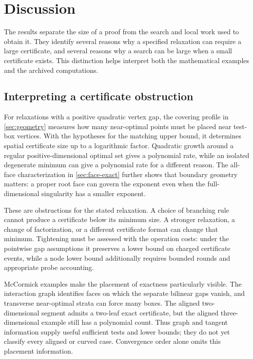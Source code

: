\section{Discussion}\label{sec:discussion}

The results separate the size of a proof from the search and local work used
to obtain it. They identify several reasons why a specified relaxation can
require a large certificate, and several reasons why a search can be large
when a small certificate exists. This distinction helps interpret both the
mathematical examples and the archived computations.

\subsection{Interpreting a certificate obstruction}\label{discussion:obstruction}

For relaxations with a positive quadratic vertex gap, the covering profile
in \cref{sec:geometry} measures how many near-optimal points must be placed
near test-box vertices. With the hypotheses for the matching upper bound,
it determines spatial certificate size up to a logarithmic factor.
Quadratic growth around a regular positive-dimensional optimal set gives a
polynomial rate, while an isolated degenerate minimum can give a polynomial
rate for a different reason. The all-face characterization in
\cref{sec:face-exact} further shows that boundary geometry matters: a proper
root face can govern the exponent even when the full-dimensional singularity
has a smaller exponent.

These are obstructions for the stated relaxation. A choice of branching
rule cannot produce a certificate below its minimum size. A stronger
relaxation, a change of factorization, or a different certificate format can
change that minimum. Tightening must be assessed with the operation costs:
under the pointwise gap assumptions it preserves a lower bound on charged
certificate events, while a node lower bound additionally requires bounded
rounds and appropriate probe accounting.

McCormick examples make the placement of exactness particularly visible.
The interaction graph identifies faces on which the separate bilinear gaps
vanish, and transverse near-optimal strata can force many boxes. The
aligned two-dimensional segment admits a two-leaf exact certificate, but the
aligned three-dimensional example still has a polynomial count. Thus graph
and tangent information supply useful sufficient tests and lower bounds;
they do not yet classify every aligned or curved case. Convergence order
alone omits this placement information.

